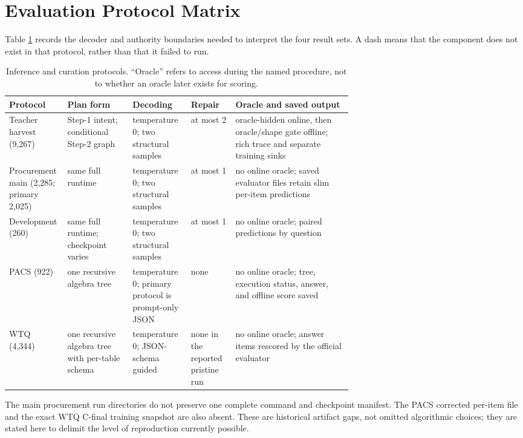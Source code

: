 \section{Evaluation Protocol Matrix}
\label{app:protocol-matrix}

Table \ref{tab:protocol-matrix} records the decoder and authority boundaries needed to interpret
the four result sets.  A dash means that the component does not exist in that protocol, rather than
that it failed to run.

\begin{table}[h]
  \centering
  \caption{Inference and curation protocols.  ``Oracle'' refers to access during the named
  procedure, not to whether an oracle later exists for scoring.}
  \label{tab:protocol-matrix}
  \small
  \begin{tabularx}{\linewidth}{p{0.17\linewidth}p{0.19\linewidth}p{0.17\linewidth}p{0.13\linewidth}X}
    \toprule
    Protocol & Plan form & Decoding & Repair & Oracle and saved output \\
    \midrule
    Teacher harvest (9,267) & Step-1 intent; conditional Step-2 graph & temperature 0; two structural samples & at most 2 & oracle-hidden online, then oracle/shape gate offline; rich trace and separate training sinks \\
    Procurement main (2,285; primary 2,025) & same full runtime & temperature 0; two structural samples & at most 1 & no online oracle; saved evaluator files retain slim per-item predictions \\
    Development (260) & same full runtime; checkpoint varies & temperature 0; two structural samples & at most 1 & no online oracle; paired predictions by question \\
    PACS (922) & one recursive algebra tree & temperature 0; primary protocol is prompt-only JSON & none & no online oracle; tree, execution status, answer, and offline score saved \\
    WTQ (4,344) & one recursive algebra tree with per-table schema & temperature 0; JSON-schema guided & none in the reported pristine run & no online oracle; answer items rescored by the official evaluator \\
    \bottomrule
  \end{tabularx}
\end{table}

The main procurement run directories do not preserve one complete command and checkpoint manifest.
The PACS corrected per-item file and the exact WTQ C-final training snapshot are also absent.  These
are historical artifact gaps, not omitted algorithmic choices; they are stated here to delimit the
level of reproduction currently possible.

